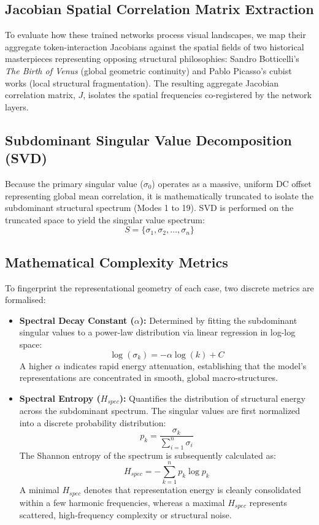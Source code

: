 \documentclass[11pt,twocolumn]{article}
\begin{document}
\subsection{Jacobian Spatial Correlation Matrix Extraction}
To evaluate how these trained networks process visual landscapes, we map their aggregate token-interaction Jacobians against the spatial fields of two historical masterpieces representing opposing structural philosophies: Sandro Botticelli’s \textit{The Birth of Venus} (global geometric continuity) and Pablo Picasso’s cubist works (local structural fragmentation). The resulting aggregate Jacobian correlation matrix, $J$, isolates the spatial frequencies co-registered by the network layers.

\subsection{Subdominant Singular Value Decomposition (SVD)}
Because the primary singular value ($\sigma_0$) operates as a massive, uniform DC offset representing global mean correlation, it is mathematically truncated to isolate the subdominant structural spectrum (Modes 1 to 19). SVD is performed on the truncated space to yield the singular value spectrum:
\begin{equation}
S = \{\sigma_1, \sigma_2, \dots, \sigma_n\}
\end{equation}

\subsection{Mathematical Complexity Metrics}
To fingerprint the representational geometry of each case, two discrete metrics are formalised:
\begin{itemize}
    \item \textbf{Spectral Decay Constant ($\alpha$):} 
    Determined by fitting the subdominant singular values to a power-law distribution via linear regression in log-log space:
    \begin{equation}
    \log(\sigma_k) = -\alpha \log(k) + C
    \end{equation}
    A higher $\alpha$ indicates rapid energy attenuation, establishing that the model's representations are concentrated in smooth, global macro-structures.

    \item \textbf{Spectral Entropy ($H_{spec}$):}
    Quantifies the distribution of structural energy across the subdominant spectrum. The singular values are first normalized into a discrete probability distribution:
    \begin{equation}
    p_k = \frac{\sigma_k}{\sum_{i=1}^{n} \sigma_i}
    \end{equation}
    The Shannon entropy of the spectrum is subsequently calculated as:
    \begin{equation}
    H_{spec} = -\sum_{k=1}^{n} p_k \log p_k
    \end{equation}
    A minimal $H_{spec}$ denotes that representation energy is cleanly consolidated within a few harmonic frequencies, whereas a maximal $H_{spec}$ represents scattered, high-frequency complexity or structural noise.
\end{itemize}
\end{document}
